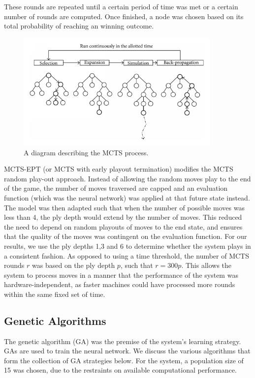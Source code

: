 \documentclass[12pt,a4paper]{article}
\begin{document}
        These rounds are repeated until a certain period of time was met or a certain number of rounds are computed. Once finished, a node was chosen based on its total probability of reaching an winning outcome.

        \begin{figure}[!ht]
            \centering
            \includegraphics[width=100mm]{images/montecarlo.png}
            \caption{A diagram describing the MCTS process.}
        \end{figure}

        MCTS-EPT (or MCTS with early playout termination) modifies the MCTS random play-out approach. Instead of allowing the random moves play to the end of the game, the number of moves traversed are capped and an evaluation function (which was the neural network) was applied at that future state instead. \cite{lorentz_using_2016} The model was then adapted such that when the number of possible moves was less than 4, the ply depth would extend by the number of moves. This reduced the need to depend on random playouts of moves to the end state, and ensures that the quality of the moves was contingent on the evaluation function. For our results, we use the ply depths 1,3 and 6 to determine whether the system plays in a consistent fashion. As opposed to using a time threshold, the number of MCTS rounds $r$ was based on the ply depth $p$, such that $r=300p$. This allows the system to process moves in a manner that the performance of the system was hardware-independent, as faster machines could have processed more rounds within the same fixed set of time.



    \subsection{Genetic Algorithms}
        The genetic algorithm (GA) was the premise of the system's learning strategy. GAs are used to train the neural network. We discuss the various algorithms that form the collection of GA strategies below. For the system, a population size of 15 was chosen, due to the restraints on available computational performance.
\end{document}
